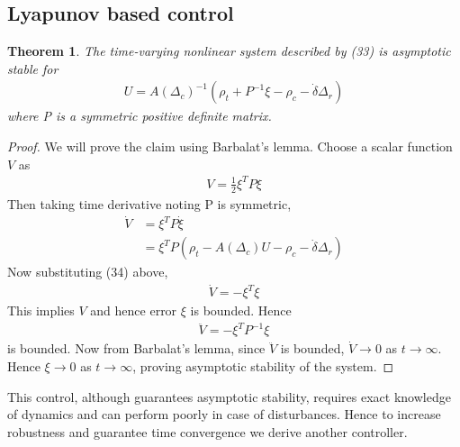 \documentclass[]{article}
\newtheorem{theorem}{Theorem}
\theoremstyle{remark}
\theoremstyle{definition}
\begin{document}
	\subsection{Lyapunov based control}
	\begin{theorem}
	The time-varying nonlinear system described by (33) is asymptotic stable for \begin{align}
		U = A(\Delta_c)^{-1}(\rho_t + P^{-1}\xi - \rho_c-\dot\delta\Delta_r)
	\end{align}  where P is a symmetric positive definite matrix.	
	\end{theorem} 
\begin{proof}
 We will prove the claim using Barbalat's lemma.  Choose a scalar function $V$ as
\begin{align}
	V = \frac{1}{2}\xi^TP\xi
\end{align}
Then taking time derivative noting P is symmetric,
\begin{align}
	\dot V &= \xi^TP\dot\xi \\
	& = \xi^TP(\rho_t -  A(\Delta_c)U-\rho_c - \dot \delta \Delta_r)
\end{align}
Now substituting (34) above,
\begin{align}
	\dot V = -\xi^T\xi
\end{align}
This implies $V$ and hence error $\xi$ is bounded.
Hence \begin{align}
	\ddot V = -\xi^TP^{-1}\xi
\end{align}
is bounded. 
Now from Barbalat's lemma, since $\ddot V$ is bounded, $\dot V \to 0$ as $t\to \infty$. Hence $\xi \to 0$ as $t\to \infty$, proving asymptotic stability of the system.

\end{proof}
This control, although guarantees asymptotic stability, requires exact knowledge of dynamics and can perform poorly in case of disturbances. Hence to increase robustness and guarantee time convergence we derive another controller.
\end{document}
